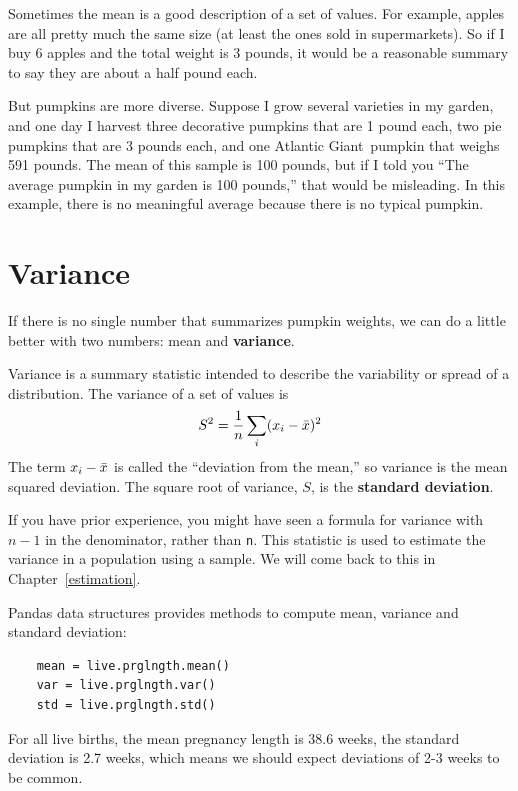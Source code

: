 \documentclass[12pt]{book}
\begin{document}
Sometimes the mean is a good description of a set of values.  For
example, apples are all pretty much the same size (at least the ones
sold in supermarkets).  So if I buy 6 apples and the total weight is 3
pounds, it would be a reasonable summary to say they are about a half
pound each.

But pumpkins are more diverse.  Suppose I grow several varieties in my
garden, and one day I harvest three decorative pumpkins that are 1
pound each, two pie pumpkins that are 3 pounds each, and one Atlantic
Giant\textregistered~pumpkin that weighs 591 pounds.  The mean of this
sample is 100 pounds, but if I told you ``The average pumpkin in my
garden is 100 pounds,'' that would be misleading.  In this example,
there is no meaningful average because there is no typical pumpkin.



\section{Variance}

If there is no single number that summarizes pumpkin weights,
we can do a little better with two numbers: mean and {\bf variance}.

Variance is a summary statistic intended to describe the variability
or spread of a distribution.  The variance of a set of values is
%
\[ S^2 = \frac{1}{n} \sum_i (x_i - \bar{x})^2 \]
%
The term $x_i - \bar{x}$ is called the ``deviation from the mean,'' so
variance is the mean squared deviation.  The square root of variance,
$S$, is the {\bf standard deviation}.  

If you have prior experience, you might have seen a formula for
variance with $n-1$ in the denominator, rather than \verb"n".  This
statistic is used to estimate the variance in a population using a
sample.  We will come back to this in Chapter~\ref{estimation}.

Pandas data structures provides methods to compute mean, variance and
standard deviation:

\begin{verbatim}
    mean = live.prglngth.mean()
    var = live.prglngth.var()
    std = live.prglngth.std()
\end{verbatim}

For all live births, the mean pregnancy length is 38.6 weeks, the
standard deviation is 2.7 weeks, which means we should expect
deviations of 2-3 weeks to be common.
\end{document}
